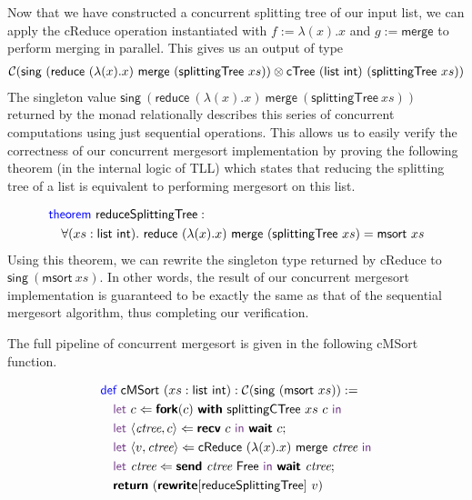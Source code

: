 Now that we have constructed a concurrent splitting tree of our input list, we can
apply the \textsf{cReduce} operation instantiated with $f := \lambda(x). x$
and $g := \textsf{merge}$ to perform merging in parallel.
This gives us an output of type
\begin{align*}
  \CM{\textsf{sing}\ (\textsf{reduce}\ (\lambda(x). x)\ \textsf{merge}\ (\textsf{splittingTree}\ xs)) \otimes \textsf{cTree}\ (\textsf{list}\ \textsf{int})\ (\textsf{splittingTree}\ xs)} 
\end{align*}
The singleton value 
$\textsf{sing}\ (\textsf{reduce}\ (\lambda(x). x)\ \textsf{merge}\ (\textsf{splittingTree}\ xs))$
returned by the monad relationally describes this series of concurrent computations using just 
sequential operations. This allows us to easily verify the correctness of our concurrent mergesort
implementation by proving the following theorem (in the internal logic of TLL) which states that 
reducing the splitting tree of a list is equivalent to performing mergesort on this list.

\vspace{-1em}
\begingroup
\small
\addtolength{\jot}{-0.2em}
\begin{align*}
  &\Theorem\ \textsf{reduceSplittingTree} : \\
  &\quad\forall (xs : \textsf{list}\ \textsf{int}).\ \textsf{reduce}\ (\lambda(x). x)\ \textsf{merge}\ (\textsf{splittingTree}\ xs) = \textsf{msort}\ xs
\end{align*}
\endgroup
Using this theorem, we can rewrite the singleton type returned by \textsf{cReduce} to
$\textsf{sing}\ (\textsf{msort}\ xs)$. In other words, the result of our concurrent
mergesort implementation is guaranteed to be exactly the same as that of the sequential
mergesort algorithm, thus completing our verification.

The full pipeline of concurrent mergesort is given in the following \textsf{cMSort} function.

\vspace{-1em}
\begingroup
\small
\addtolength{\jot}{-0.2em}
\begin{align*}
  &\Def\ \textsf{cMSort}\ (xs : \textsf{list}\ \textsf{int}) : \CM{\textsf{sing}\ (\textsf{msort}\ xs)} := \\
  &\quad\Let\ c \Leftarrow \Fork(c)\ \With\ \textsf{splittingCTree}\ xs\ c\ \In \\ 
  &\quad\Let\ \langle{\textit{ctree}, c}\rangle \Leftarrow \Recv\ c\ \In\ \Wait\ c; \\
  &\quad\Let\ \langle{v, \textit{ctree}}\rangle \Leftarrow \textsf{cReduce}\ (\lambda(x). x)\ \textsf{merge}\ \textit{ctree}\ \In \\
  &\quad\Let\ \textit{ctree} \Leftarrow \Send\ \textit{ctree}\ \textsf{Free}\ \In\ \Wait\ \textit{ctree}; \\
  &\quad\Return\ (\Rewrite[\textsf{reduceSplittingTree}]\ v)
\end{align*}
\endgroup

